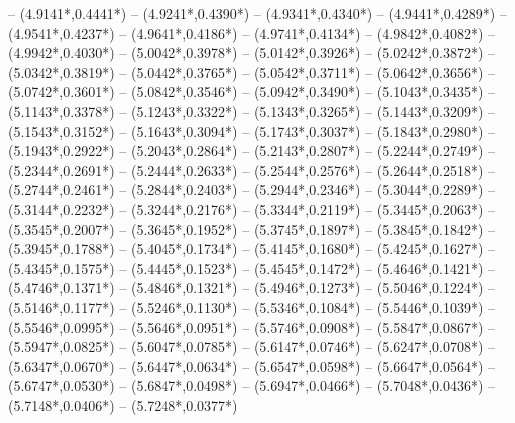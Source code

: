 {	-- ({4.9141*\dx},{0.4441*\dy})
	-- ({4.9241*\dx},{0.4390*\dy})
	-- ({4.9341*\dx},{0.4340*\dy})
	-- ({4.9441*\dx},{0.4289*\dy})
	-- ({4.9541*\dx},{0.4237*\dy})
	-- ({4.9641*\dx},{0.4186*\dy})
	-- ({4.9741*\dx},{0.4134*\dy})
	-- ({4.9842*\dx},{0.4082*\dy})
	-- ({4.9942*\dx},{0.4030*\dy})
	-- ({5.0042*\dx},{0.3978*\dy})
	-- ({5.0142*\dx},{0.3926*\dy})
	-- ({5.0242*\dx},{0.3872*\dy})
	-- ({5.0342*\dx},{0.3819*\dy})
	-- ({5.0442*\dx},{0.3765*\dy})
	-- ({5.0542*\dx},{0.3711*\dy})
	-- ({5.0642*\dx},{0.3656*\dy})
	-- ({5.0742*\dx},{0.3601*\dy})
	-- ({5.0842*\dx},{0.3546*\dy})
	-- ({5.0942*\dx},{0.3490*\dy})
	-- ({5.1043*\dx},{0.3435*\dy})
	-- ({5.1143*\dx},{0.3378*\dy})
	-- ({5.1243*\dx},{0.3322*\dy})
	-- ({5.1343*\dx},{0.3265*\dy})
	-- ({5.1443*\dx},{0.3209*\dy})
	-- ({5.1543*\dx},{0.3152*\dy})
	-- ({5.1643*\dx},{0.3094*\dy})
	-- ({5.1743*\dx},{0.3037*\dy})
	-- ({5.1843*\dx},{0.2980*\dy})
	-- ({5.1943*\dx},{0.2922*\dy})
	-- ({5.2043*\dx},{0.2864*\dy})
	-- ({5.2143*\dx},{0.2807*\dy})
	-- ({5.2244*\dx},{0.2749*\dy})
	-- ({5.2344*\dx},{0.2691*\dy})
	-- ({5.2444*\dx},{0.2633*\dy})
	-- ({5.2544*\dx},{0.2576*\dy})
	-- ({5.2644*\dx},{0.2518*\dy})
	-- ({5.2744*\dx},{0.2461*\dy})
	-- ({5.2844*\dx},{0.2403*\dy})
	-- ({5.2944*\dx},{0.2346*\dy})
	-- ({5.3044*\dx},{0.2289*\dy})
	-- ({5.3144*\dx},{0.2232*\dy})
	-- ({5.3244*\dx},{0.2176*\dy})
	-- ({5.3344*\dx},{0.2119*\dy})
	-- ({5.3445*\dx},{0.2063*\dy})
	-- ({5.3545*\dx},{0.2007*\dy})
	-- ({5.3645*\dx},{0.1952*\dy})
	-- ({5.3745*\dx},{0.1897*\dy})
	-- ({5.3845*\dx},{0.1842*\dy})
	-- ({5.3945*\dx},{0.1788*\dy})
	-- ({5.4045*\dx},{0.1734*\dy})
	-- ({5.4145*\dx},{0.1680*\dy})
	-- ({5.4245*\dx},{0.1627*\dy})
	-- ({5.4345*\dx},{0.1575*\dy})
	-- ({5.4445*\dx},{0.1523*\dy})
	-- ({5.4545*\dx},{0.1472*\dy})
	-- ({5.4646*\dx},{0.1421*\dy})
	-- ({5.4746*\dx},{0.1371*\dy})
	-- ({5.4846*\dx},{0.1321*\dy})
	-- ({5.4946*\dx},{0.1273*\dy})
	-- ({5.5046*\dx},{0.1224*\dy})
	-- ({5.5146*\dx},{0.1177*\dy})
	-- ({5.5246*\dx},{0.1130*\dy})
	-- ({5.5346*\dx},{0.1084*\dy})
	-- ({5.5446*\dx},{0.1039*\dy})
	-- ({5.5546*\dx},{0.0995*\dy})
	-- ({5.5646*\dx},{0.0951*\dy})
	-- ({5.5746*\dx},{0.0908*\dy})
	-- ({5.5847*\dx},{0.0867*\dy})
	-- ({5.5947*\dx},{0.0825*\dy})
	-- ({5.6047*\dx},{0.0785*\dy})
	-- ({5.6147*\dx},{0.0746*\dy})
	-- ({5.6247*\dx},{0.0708*\dy})
	-- ({5.6347*\dx},{0.0670*\dy})
	-- ({5.6447*\dx},{0.0634*\dy})
	-- ({5.6547*\dx},{0.0598*\dy})
	-- ({5.6647*\dx},{0.0564*\dy})
	-- ({5.6747*\dx},{0.0530*\dy})
	-- ({5.6847*\dx},{0.0498*\dy})
	-- ({5.6947*\dx},{0.0466*\dy})
	-- ({5.7048*\dx},{0.0436*\dy})
	-- ({5.7148*\dx},{0.0406*\dy})
	-- ({5.7248*\dx},{0.0377*\dy})
}
